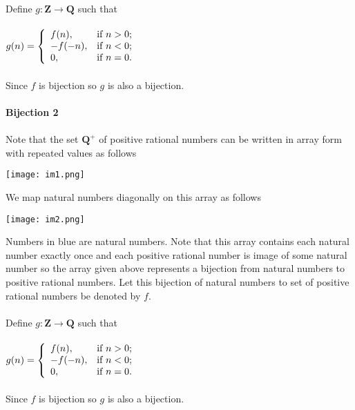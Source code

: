 \documentclass{article}
\begin{document}
\\ \\ Define $g: \mathbf{Z}\rightarrow \mathbf{Q}$ such that \\ \\ $g(n)=\left\{
                                                                          \begin{array}{ll}
                                                                            f(n), & \hbox{if $n>0$;} \\
                                                                            -f(-n), & \hbox{if $n<0$;} \\
                                                                            0, & \hbox{if $n=0$.}
                                                                          \end{array}
                                                                        \right.$
\\ \\ Since $f$ is bijection so $g$ is also a bijection. \\ \\
\textbf{Bijection 2} \\ \\
Note that the set $\mathbf{Q^+}$ of positive rational numbers can be written in array form with repeated values as follows
\begin{center}
\texttt{[image: im1.png]}
\end{center}
We map natural numbers diagonally on this array as follows
\begin{center}
\texttt{[image: im2.png]}
\end{center}
Numbers in blue are natural numbers. Note that this array contains each natural number exactly once and each positive rational number is image of some natural number so the array given above represents a bijection from natural numbers to positive rational numbers. Let this bijection of natural numbers to set of positive rational numbers be denoted by $f$.
\\ \\ Define $g: \mathbf{Z}\rightarrow \mathbf{Q}$ such that \\ \\ $g(n)=\left\{
                                                                          \begin{array}{ll}
                                                                            f(n), & \hbox{if $n>0$;} \\
                                                                            -f(-n), & \hbox{if $n<0$;} \\
                                                                            0, & \hbox{if $n=0$.}
                                                                          \end{array}
                                                                        \right.$
\\ \\ Since $f$ is bijection so $g$ is also a bijection.
\end{document}
